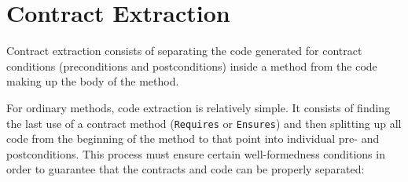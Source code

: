 \documentclass{sig-alternate}
\begin{document}
\section{Contract Extraction}
\label{sec:extraction}
\noindent
Contract extraction consists of separating the code generated for
contract conditions (preconditions and postconditions) inside a method
from the code making up the body of the method.

For ordinary methods, code extraction is relatively simple. It
consists of finding the last use of a contract method
(\lstinline{Requires} or \lstinline{Ensures}) and then splitting up all code
from the beginning of the method to that point into individual pre- and
postconditions. This process must ensure certain well-formedness
conditions in order to guarantee that the contracts and code can be
properly separated:
\end{document}
